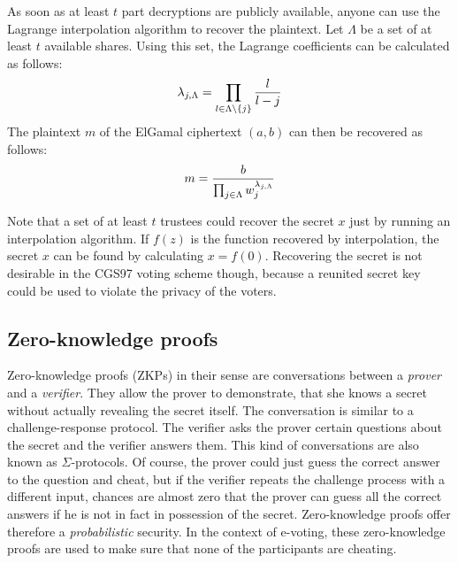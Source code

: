 \documentclass[numbers=noenddot, abstract=on, a4paper, headsepline,
footsepline, oneside, draft=off]{scrreprt}
\begin{document}
As soon as at least $t$ part decryptions are publicly available, anyone can use
the Lagrange interpolation algorithm to recover the plaintext. Let $\Lambda$ be a set of
at least $t$ available shares. Using this set, the Lagrange coefficients can be
calculated as follows:
\begin{equation}
	\lambda_{j,\Lambda} = \prod_{l\in \Lambda \backslash \{j\}} \frac{l}{l-j} \notag
\end{equation}
The plaintext $m$ of the ElGamal ciphertext $(a, b)$ can then be recovered as
follows:
\begin{equation}
	m = \frac{b}{\prod_{j \in \Lambda} w_j^{\lambda_{j,\Lambda}}} \notag
\end{equation}

Note that a set of at least $t$ trustees could recover the secret $x$ just
by running an interpolation algorithm. If $f(z)$ is the function recovered by
interpolation, the secret $x$ can be found by calculating $x=f(0)$. Recovering
the secret is not desirable in the CGS97 voting scheme though, because a
reunited secret key could be used to violate the privacy of the voters.

\subsection{Zero-knowledge proofs}
\label{sec:zeroknowledgeproofs}
Zero-knowledge proofs (ZKPs) in their sense are conversations between a
\textit{prover} and a \textit{verifier}. They allow the prover to demonstrate,
that she knows a secret without actually revealing the secret itself. The
conversation is similar to a challenge-response protocol. The verifier asks the
prover certain questions about the secret and the verifier answers them. This
kind of conversations are also known as $\Sigma$-protocols. Of course, the
prover could just guess the correct answer to the question and cheat, but if the
verifier repeats the challenge process with a different input, chances are
almost zero that the prover can guess all the correct answers if he is not in
fact in possession of the secret. Zero-knowledge proofs offer therefore a
\textit{probabilistic} security. In the context of e-voting, these
zero-knowledge proofs are used to make sure that none of the participants are
cheating.
\end{document}
